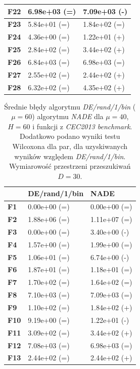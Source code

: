 \documentclass[12pt,a4paper]{report}
\begin{document}
{{{{{{\begin{table}[]
\begin{tabular}{|l|l|l|}
{\bf F22} & 6.98e+03 (=)        & 7.09e+03 (-)    \\ \hline
{\bf F23} & 5.84e+01 (=)        & 1.84e+02 (=)    \\ \hline
{\bf F24} & 4.36e+00 (=)        & 1.22e+01 (+)    \\ \hline
{\bf F25} & 2.84e+02 (=)        & 3.44e+02 (+)    \\ \hline
{\bf F26} & 6.84e+03 (=)        & 6.98e+03 (=)    \\ \hline
{\bf F27} & 2.55e+02 (=)        & 2.44e+02 (+)    \\ \hline
{\bf F28} & 6.32e+02 (=)        & 4.35e+02 (+)    \\ \hline
\end{tabular}
\end{table}

\begin{table}[]
\centering
\caption{Średnie błędy algorytmu \emph{DE/rand/1/bin} ($\mu = 60$) algorytmu \emph{NADE} dla $\mu = 40$, $H = 60$ i funkcji z \emph{CEC2013 benchmark}. Dodatkowo podano wyniki testu Wilcoxona dla par, dla uzyskiwanych wyników względem \emph{DE/rand/1/bin}. Wymiarowość przestrzeni przeszukiwań $D = 30$.}
\label{Eksp4}
\begin{tabular}{|l|l|l|}
\hline
          & {\bf DE/rand/1/bin} & {\bf NADE}   \\ \hline
{\bf F1}  & 0.00e+00 (=)        & 0.00e+00 (=) \\ \hline
{\bf F2}  & 1.88e+06 (=)        & 1.11e+07 (=) \\ \hline
{\bf F3}  & 0.00e+00 (=)        & 3.40e+00 (-) \\ \hline
{\bf F4}  & 1.57e+00 (=)        & 1.99e+00 (=) \\ \hline
{\bf F5}  & 1.06e+01 (=)        & 6.74e+00 (-) \\ \hline
{\bf F6}  & 1.87e+01 (=)        & 1.18e+01 (=) \\ \hline
{\bf F7}  & 1.70e+02 (=)        & 1.64e+02 (=) \\ \hline
{\bf F8}  & 7.10e+03 (=)        & 7.09e+03 (=) \\ \hline
{\bf F9}  & 1.10e+02 (=)        & 1.84e+02 (+) \\ \hline
{\bf F10} & 9.19e+00 (=)        & 1.22e+01 (-) \\ \hline
{\bf F11} & 3.09e+02 (=)        & 3.44e+02 (+) \\ \hline
{\bf F12} & 7.08e+03 (=)        & 6.98e+03 (=) \\ \hline
{\bf F13} & 2.44e+02 (=)        & 2.44e+02 (+) \\ \hline

\end{tabular}
\end{table}}}}}}}
\end{document}
